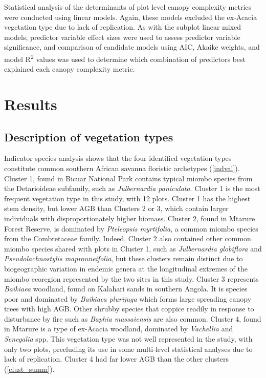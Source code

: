 \documentclass[11pt,a4paper]{article}
\begin{document}
Statistical analysis of the determinants of plot level canopy complexity metrics were conducted using linear models. Again, these models excluded the ex-Acacia vegetation type due to lack of replication. As with the subplot linear mixed models, predictor variable effect sizes were used to assess predictor variable significance, and comparison of candidate models using AIC, Akaike weights, and model R\textsuperscript{2} values was used to determine which combination of predictors best explained each canopy complexity metric.





\section{Results}

\subsection{Description of vegetation types}

Indicator species analysis shows that the four identified vegetation types constitute common southern African savanna floristic archetypes (\autoref{indval}). Cluster 1, found in Bicuar National Park contains typical miombo species from the Detarioideae subfamily, such as \textit{Julbernardia paniculata}. Cluster 1 is the most frequent vegetation type in this study, with 12 plots. Cluster 1 has the highest stem density, but lower AGB than Clusters 2 or 3, which contain larger individuals with disproportionately higher biomass. Cluster 2, found in Mtarure Forest Reserve, is dominated by \textit{Pteleopsis myrtifolia}, a common miombo species from the Combretaceae family. Indeed, Cluster 2 also contained other common miombo species shared with plots in Cluster 1, such as \textit{Julbernardia globiflora} and \textit{Pseudolachnostylis maprouneifolia}, but these clusters remain distinct due to biogeographic variation in endemic genera at the longitudinal extremes of the miombo ecoregion represented by the two sites in this study. Cluster 3 represents \textit{Baikiaea} woodland, found on Kalahari sands in southern Angola. It is species poor and dominated by \textit{Baikiaea plurijuga} which forms large spreading canopy trees with high AGB. Other shrubby species that coppice readily in response to disturbance by fire such as \textit{Baphia massaiensis} are also common. Cluster 4, found in Mtarure is a type of ex-Acacia woodland, dominated by \textit{Vachellia} and \textit{Senegalia} spp. This vegetation type was not well represented in the study, with only two plots, precluding its use in some multi-level statistical analyses due to lack of replication. Cluster 4 had far lower AGB than the other clusters (\autoref{clust_summ}). 
\end{document}

